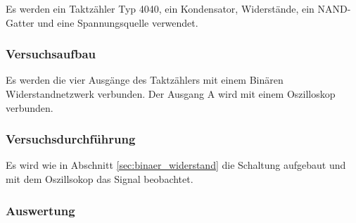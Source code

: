 \documentclass[12pt,a4paper]{article}
\begin{document}
Es werden ein Taktzähler Typ 4040, ein Kondensator, Widerstände, ein NAND-Gatter und eine Spannungsquelle verwendet.

\subsubsection*{Versuchsaufbau}
\label{sec:binaer_widerstand}

Es werden die vier Ausgänge des Taktzählers mit einem Binären Widerstandnetzwerk verbunden. Der Ausgang A wird mit einem Oszilloskop verbunden.

\subsubsection*{Versuchsdurchführung}

Es wird wie in Abschnitt \ref{sec:binaer_widerstand}  die Schaltung aufgebaut und mit dem Oszillsokop das Signal beobachtet.

\subsubsection*{Auswertung}
\end{document}
